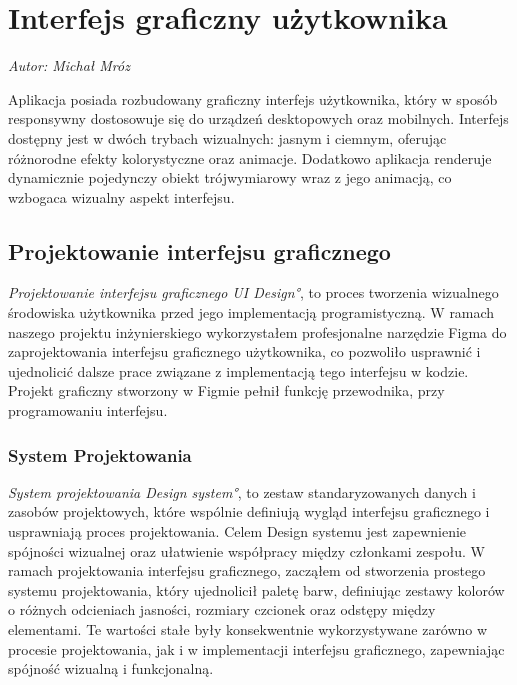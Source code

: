 \chapter{Interfejs graficzny użytkownika}
\label{chap:InterfejsGraficznyUżytkownika}
\textit{Autor: Michał Mróz}
\par Aplikacja posiada rozbudowany graficzny interfejs użytkownika, który w sposób responsywny dostosowuje się do urządzeń desktopowych oraz mobilnych. Interfejs dostępny jest w dwóch trybach wizualnych: jasnym i ciemnym, oferując różnorodne efekty kolorystyczne oraz animacje. Dodatkowo aplikacja renderuje dynamicznie pojedynczy obiekt trójwymiarowy wraz z jego animacją, co wzbogaca wizualny aspekt interfejsu.

\section{Projektowanie interfejsu graficznego}
\label{sec:ProjektowanieInterfejsuGraficznego}

\emph{Projektowanie interfejsu graficznego \ang{UI Design}}, to proces tworzenia wizualnego środowiska użytkownika przed jego implementacją programistyczną. W ramach naszego projektu inżynierskiego wykorzystałem profesjonalne narzędzie Figma \cite{Figma} do zaprojektowania interfejsu graficznego użytkownika, co pozwoliło usprawnić i ujednolicić dalsze prace związane z implementacją tego interfejsu w kodzie. Projekt graficzny stworzony w Figmie pełnił funkcję przewodnika, przy programowaniu interfejsu.


\subsection{System Projektowania}
\label{sec:SystemProjektowania}

\emph{System projektowania \ang{Design system}}, to zestaw standaryzowanych danych i zasobów projektowych, które wspólnie definiują wygląd interfejsu graficznego i usprawniają proces projektowania. Celem Design systemu jest zapewnienie spójności wizualnej oraz ułatwienie współpracy między członkami zespołu. 
W ramach projektowania interfejsu graficznego, zacząłem od stworzenia prostego systemu projektowania, który ujednolicił paletę barw, definiując zestawy kolorów o różnych odcieniach jasności, rozmiary czcionek oraz odstępy między elementami. Te wartości stałe były konsekwentnie wykorzystywane zarówno w procesie projektowania, jak i w implementacji interfejsu graficznego, zapewniając spójność wizualną i funkcjonalną. 

